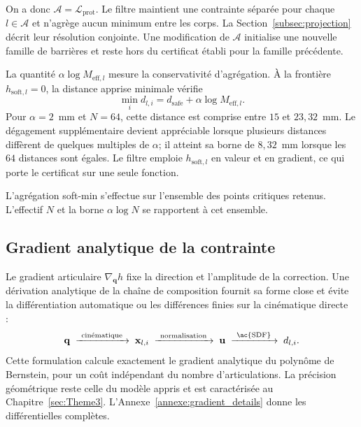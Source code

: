On a donc $\mathcal{A}=\mathcal{L}_{\mathrm{prot}}$. Le filtre maintient une contrainte séparée pour chaque $l\in\mathcal{A}$ et n'agrège aucun minimum entre les corps. La Section~\ref{subsec:projection} décrit leur résolution conjointe. Une modification de $\mathcal{A}$ initialise une nouvelle famille de barrières et reste hors du certificat établi pour la famille précédente.

La quantité $\alpha\log M_{\mathrm{eff},l}$ mesure la conservativité d'agrégation. À la frontière $h_{\mathrm{soft},l}=0$, la distance apprise minimale vérifie
\begin{equation}
\min_i d_{l,i}=d_{\mathrm{safe}}+\alpha\log M_{\mathrm{eff},l}.
\end{equation}
Pour $\alpha=2$~mm et $N=64$, cette distance est comprise entre $15$ et $23{,}32$~mm. Le dégagement supplémentaire devient appréciable lorsque plusieurs distances diffèrent de quelques multiples de $\alpha$; il atteint sa borne de $8{,}32$~mm lorsque les $64$ distances sont égales. Le filtre emploie $h_{\mathrm{soft},l}$ en valeur et en gradient, ce qui porte le certificat sur une seule fonction.

L'agrégation soft-min s'effectue sur l'ensemble des points critiques retenus. L'effectif $N$ et la borne $\alpha\log N$ se rapportent à cet ensemble.

\subsection{Gradient analytique de la contrainte}\label{subsec:gradient}
Le gradient articulaire $\nabla_{\mathbf{q}}h$ fixe la direction et l'amplitude de la correction. Une dérivation analytique de la chaîne de composition fournit sa forme close et évite la différentiation automatique ou les différences finies sur la cinématique directe~\cite{Li2024rdf} :
\begin{equation*}
\mathbf{q} \;\xrightarrow{\ \text{cinématique}\ }\; \mathbf{x}_{l,i}
\;\xrightarrow{\ \text{normalisation}\ }\; \mathbf{u}
\;\xrightarrow{\ \text{\ac{SDF}}\ }\; d_{l,i}.
\end{equation*}
Cette formulation calcule exactement le gradient analytique du polynôme de Bernstein, pour un coût indépendant du nombre d'articulations. La précision géométrique reste celle du modèle appris et est caractérisée au Chapitre~\ref{sec:Theme3}. L'Annexe~\ref{annexe:gradient_details} donne les différentielles complètes.


